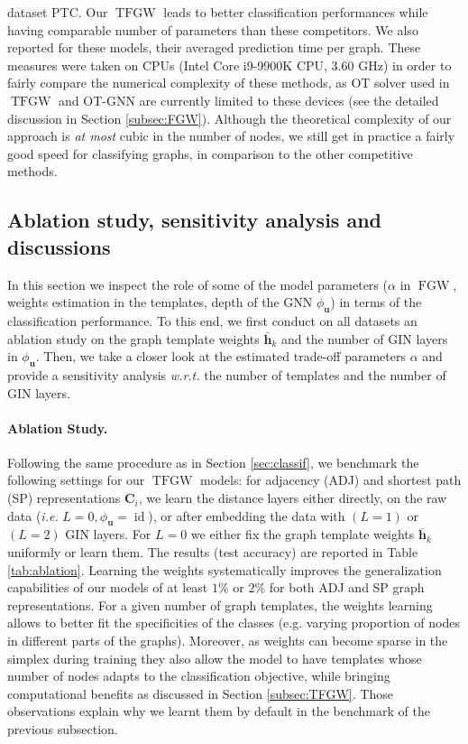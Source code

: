 \documentclass{article}
\def\vh{{\bm{h}}}
\def\vu{{\bm{u}}}
\def\mC{{\bm{C}}}
\newcommand{\FGW}{\operatorname{FGW}}
\newcommand{\TFGW}{\operatorname{TFGW}}
\begin{document}
dataset PTC. Our $\TFGW$ leads to better classification performances while
having comparable number of parameters than these competitors. We also reported
for these models, their averaged prediction time per graph. These measures were
taken on CPUs (Intel Core i9-9900K CPU, 3.60 GHz) in order to fairly compare the
numerical complexity of these methods, as OT solver used in $\TFGW$ and OT-GNN
are currently limited to these devices (see the detailed discussion in Section
\ref{subsec:FGW}). Although the theoretical complexity of our approach is
\emph{at most} cubic in the number of nodes, we still get in practice a fairly
good speed for classifying graphs, in comparison to the other competitive
methods.









\subsection{Ablation study, sensitivity analysis and discussions \label{sec:sensiti}}
In this section we inspect the role of some of the model parameters ($\alpha$ in $\FGW$, weights estimation
in the templates, depth of the GNN $\phi_\vu$) in terms of the classification performance. To this end, we first conduct on all datasets an
ablation study on the graph template weights
$\overline{\vh}_k$ and the number of GIN layers in $\phi_\vu$. 
Then, we take a closer look at the
estimated  trade-off
parameters $\alpha$ and provide a sensitivity analysis \emph{w.r.t.} the number of templates and the number of GIN layers.

\paragraph{Ablation Study.} Following the same procedure as in Section \ref{sec:classif}, we benchmark the following settings for
our $\TFGW$ models: for adjacency (ADJ) and
shortest path (SP) representations $\mC_i$, we learn the distance layers either directly, on
the raw data (\textit{i.e.} $L=0, \phi_{\mathbf{u}}=\operatorname{id}$), or after embedding the data with $(L=1)$ or $(L=2)$ GIN layers. For $L=0$ we
either fix the graph template weights $\overline{\vh}_k$ uniformly or learn them.
The results (test accuracy) are reported in Table \ref{tab:ablation}.
Learning the weights systematically improves the generalization capabilities of our
models of at least $1\%$ or $2\%$ for both ADJ and SP graph representations. For a given number of graph templates, the weights learning allows to better fit the specificities of the classes (e.g. varying proportion of nodes in different parts of the graphs). 
Moreover, as weights can become sparse in the simplex during training they also allow the model to have templates whose number of nodes adapts to the classification objective, while bringing computational benefits as discussed in Section \ref{subsec:TFGW}.
Those observations explain why we learnt them by default in the benchmark of the previous subsection.
\end{document}
